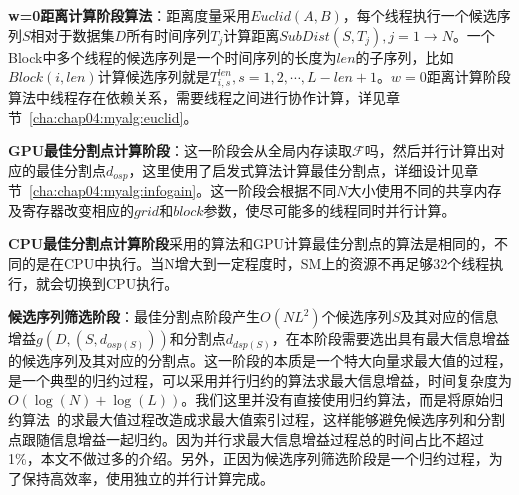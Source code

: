 \textbf{w=0距离计算阶段算法}：距离度量采用$Euclid(A,B)$，每个线程执行一个候选序列$S$相对于数据集$D$所有时间序列$T_j$计算距离$SubDist(S,T_j),j=1\to N$。一个Block中多个线程的候选序列是一个时间序列的长度为$len$的子序列，比如$Block(i,len)$计算候选序列就是$T_{i,s}^{len},s=1,2,\cdots,L-len+1$。$w=0$距离计算阶段算法中线程存在依赖关系，需要线程之间进行协作计算，详见章节~\ref{cha:chap04:myalg:euclid}。

\textbf{GPU最佳分割点计算阶段}：这一阶段会从全局内存读取$\mathcal{F}$吗，然后并行计算出对应的最佳分割点$d_{osp}$，这里使用了启发式算法计算最佳分割点，详细设计见章节~\ref{cha:chap04:myalg:infogain}。这一阶段会根据不同$N$大小使用不同的共享内存及寄存器改变相应的$grid$和$block$参数，使尽可能多的线程同时并行计算。

\textbf{CPU最佳分割点计算阶段}采用的算法和GPU计算最佳分割点的算法是相同的，不同的是在CPU中执行。当N增大到一定程度时，SM上的资源不再足够32个线程执行，就会切换到CPU执行。

\textbf{候选序列筛选阶段}：最佳分割点阶段产生$O(NL^2)$个候选序列$S$及其对应的信息增益$g(D,(S,d_{osp(S)}))$和分割点$d_{dsp(S)}$，在本阶段需要选出具有最大信息增益的候选序列及其对应的分割点。这一阶段的本质是一个特大向量求最大值的过程，是一个典型的归约过程，可以采用并行归约的算法求最大信息增益，时间复杂度为$O(\log(N)+\log(L))$。我们这里并没有直接使用归约算法，而是将原始归约算法~\cite{harris2007optimizing}的求最大值过程改造成求最大值索引过程，这样能够避免候选序列和分割点跟随信息增益一起归约。因为并行求最大信息增益过程总的时间占比不超过1\%，本文不做过多的介绍。另外，正因为候选序列筛选阶段是一个归约过程，为了保持高效率，使用独立的并行计算完成。


